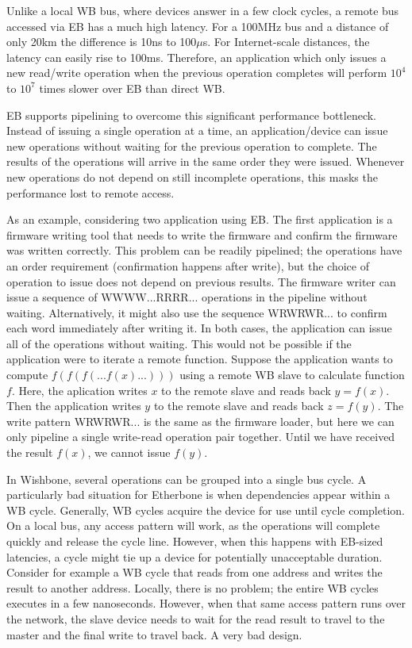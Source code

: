 \documentclass{article}
\begin{document}
Unlike a local WB bus, where devices answer in a few clock cycles,
a remote bus accessed via EB has a much high latency.
For a 100MHz bus and a distance of only 20km the difference is
10ns to 100$\mu$s. 
For Internet-scale distances, the latency can easily rise to 100ms.
Therefore, 
an application which only issues a new read/write operation when the previous
operation completes will perform $10^4$ to $10^7$ times slower over EB than direct WB.

EB supports pipelining to overcome this significant performance bottleneck.
Instead of issuing a single operation at a time,
an application/device can issue new operations without waiting
for the previous operation to complete.
The results of the operations will arrive in the same order they were issued.
Whenever new operations do not depend on still incomplete operations,
this masks the performance lost to remote access.

As an example, considering two application using EB.
The first application is a firmware writing tool that needs to write the
firmware and confirm the firmware was written correctly.
This problem can be readily pipelined; 
the operations have an order requirement (confirmation happens after write),
but the choice of operation to issue does not depend on previous results.
The firmware writer can issue a sequence of WWWW...RRRR... operations
in the pipeline without waiting.
Alternatively, it might also use the sequence WRWRWR... to confirm each word
immediately after writing it.
In both cases, the application can issue all of the operations without waiting.
This would not be possible if the application were to iterate a remote function.
Suppose the application wants to compute $f(f(f(...f(x)...)))$ 
using a remote WB slave to calculate function $f$.
Here, the aplication writes $x$ to the remote slave and reads back
$y = f(x)$.
Then the application writes $y$ to the remote slave and reads back
$z = f(y)$.
The write pattern WRWRWR... is the same as the firmware loader,
but here we can only pipeline a single write-read operation pair together.
Until we have received the result $f(x)$, we cannot issue $f(y)$.

In Wishbone, several operations can be grouped into a single bus cycle.
A particularly bad situation for Etherbone is when dependencies appear within a WB cycle.
Generally, WB cycles acquire the device for use until cycle completion.
On a local bus, any access pattern will work, 
as the operations will complete quickly and release the cycle line.
However, when this happens with EB-sized latencies, 
a cycle might tie up a device for potentially unacceptable duration.
Consider for example a WB cycle that reads from one address 
and writes the result to another address.
Locally, there is no problem; the entire WB cycles executes in a few
nanoseconds.
However, when that same access pattern runs over the network,
the slave device needs to wait for the read result to travel to the master and the final write to travel back.
A very bad design.
\end{document}
